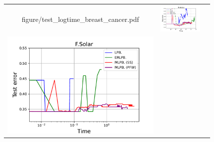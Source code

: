 \begin{figure}[p]
\begin{tabular}{ccc}
\begin{minipage}[t]{0.31\hsize}
            {figure/test_logtime_breast_cancer.pdf}
        \end{minipage}
        &
        \begin{minipage}[t]{0.31\hsize}
            \centering
            \includegraphics[keepaspectratio, scale=0.30]
            {figure/test_logtime_diabetis.pdf}
        \end{minipage}
        \\
        \begin{minipage}[t]{0.31\hsize}
            \centering
            \includegraphics[keepaspectratio, scale=0.30]
            {figure/test_logtime_flare_solar.pdf}
        \end{minipage}
        &
        \begin{minipage}[t]{0.31\hsize}
            \centering

\end{minipage}
\end{tabular}
\end{figure}
